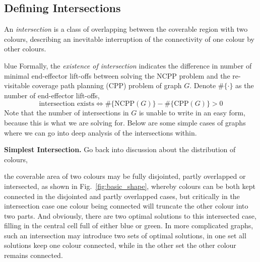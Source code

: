 \documentclass[journal]{IEEEtran}
\begin{document}
\subsection{Defining Intersections}
An \textit{intersection} is a class of overlapping between the coverable region with two colours, describing an inevitable interruption of the connectivity of one colour 
by other colours. 
\begin{color}{blue}
Formally, the \textit{existence of intersection} indicates the difference in number of minimal end-effector lift-offs between solving the NCPP problem and the re-visitable coverage path planning (CPP) problem of graph $G$. Denote $\#\{\cdot\}$ as the number of end-effector lift-offs,  
\begin{equation}
\mbox{intersection exists}\Leftrightarrow \#\{\mbox{NCPP}(G)\} - \#\{\mbox{CPP}(G)\} > 0
\end{equation} 
Note that the number of intersections in $G$ is unable to write in an easy form, because this is what we are solving for. 
Below are some simple cases of graphs where we can go into deep analysis of the intersections within. 

\textbf{Simplest Intersection.}
Go back into discussion about the distribution of colours, 
\end{color}
the coverable area of two colours may be fully disjointed, partly overlapped or intersected, as shown in Fig.~\ref{fig:basic_shape}, 
whereby colours can be both kept connected in the disjointed and partly overlapped cases, but critically in the intersection case one colour being connected will truncate the other colour into two parts. 
And obviously, there are two optimal solutions to this intersected case, filling in the central cell full of either blue or green.
In more complicated graphs, such an intersection may introduce two sets of optimal solutions, in one set all solutions keep one colour connected, 
while in the other set the other colour remains connected. 
\end{document}
